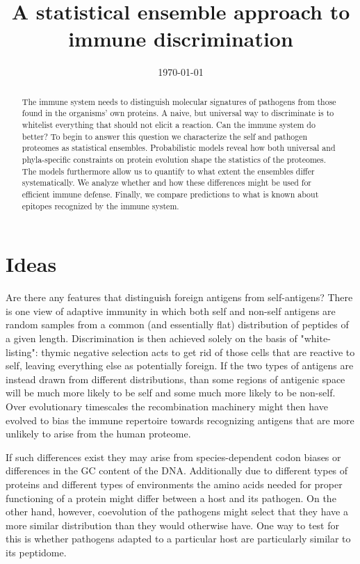 \documentclass[superscriptaddress,twocolumn,pre]{revtex4}
\newcommand{\<}{\langle}
\renewcommand{\>}{\rangle}
\begin{document}
\title{A statistical ensemble approach to immune discrimination}
\date{\today}

\begin{abstract}
The immune system needs to distinguish molecular signatures of pathogens from those found in the organisms' own proteins. A naive, but universal way to discriminate is to whitelist everything that should not elicit a reaction. Can the immune system do better? To begin to answer this question we characterize the self and pathogen proteomes as statistical ensembles. Probabilistic models reveal how both universal and phyla-specific constraints on protein evolution shape the statistics of the proteomes. The models furthermore allow us to quantify to what extent the ensembles differ systematically. We analyze whether and how these differences might be used for efficient immune defense. Finally, we compare predictions to what is known about epitopes recognized by the immune system. 
\end{abstract}

\maketitle

\section{Ideas}


Are there any features that distinguish foreign antigens from self-antigens? There is one view of adaptive immunity in which both self and non-self antigens are random samples from a common (and essentially flat) distribution of peptides of a given length. Discrimination is then achieved solely on the basis of "white-listing": thymic negative selection acts to get rid of those cells that are reactive to self, leaving everything else as potentially foreign. If the two types of antigens are instead drawn from different distributions, than some regions of antigenic space will be much more likely to be self and some much more likely to be non-self. Over evolutionary timescales the recombination machinery might then have evolved to bias the immune repertoire towards recognizing antigens that are more unlikely to arise from the human proteome.

If such differences exist they may arise from species-dependent codon biases or differences in the GC content of the DNA. Additionally due to different types of proteins and different types of environments the amino acids needed for proper functioning of a protein might differ between a host and its pathogen. On the other hand, however, coevolution of the pathogens might select that they have a more similar distribution than they would otherwise have. One way to test for this is whether pathogens adapted to a particular host are particularly similar to its peptidome.
\end{document}

